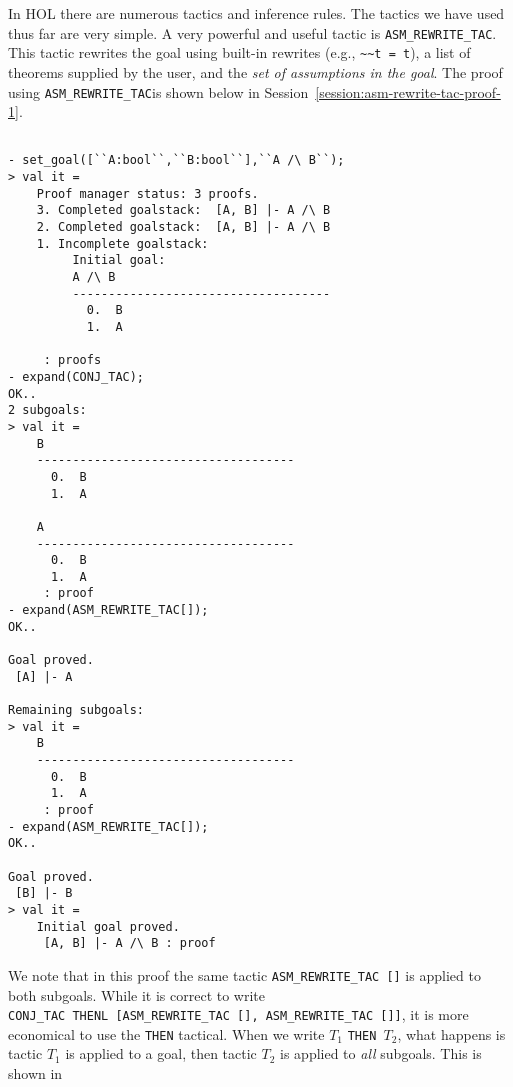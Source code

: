 In HOL there are numerous tactics and inference rules. The tactics we
have used thus far are very simple.  A very powerful and useful tactic
is \verb|ASM_REWRITE_TAC|.  This tactic rewrites the goal using
built-in rewrites (e.g., \verb|~~t = t|), a list of theorems supplied
by the user, and the \emph{set of assumptions in the goal}. The proof
using \verb|ASM_REWRITE_TAC|is shown below in
Session~\ref{session:asm-rewrite-tac-proof-1}.
\begin{session}
  \label{session:asm-rewrite-tac-proof-1}
  \begin{scriptsize}
\begin{verbatim}

- set_goal([``A:bool``,``B:bool``],``A /\ B``);
> val it =
    Proof manager status: 3 proofs.
    3. Completed goalstack:  [A, B] |- A /\ B
    2. Completed goalstack:  [A, B] |- A /\ B
    1. Incomplete goalstack:
         Initial goal:
         A /\ B
         ------------------------------------
           0.  B
           1.  A
         
     : proofs
- expand(CONJ_TAC);
OK..
2 subgoals:
> val it =
    B
    ------------------------------------
      0.  B
      1.  A
    
    A
    ------------------------------------
      0.  B
      1.  A
     : proof
- expand(ASM_REWRITE_TAC[]);
OK..

Goal proved.
 [A] |- A

Remaining subgoals:
> val it =
    B
    ------------------------------------
      0.  B
      1.  A
     : proof
- expand(ASM_REWRITE_TAC[]);
OK..

Goal proved.
 [B] |- B
> val it =
    Initial goal proved.
     [A, B] |- A /\ B : proof
\end{verbatim}
  \end{scriptsize} \end{session} We note that in this proof the same
tactic \verb|ASM_REWRITE_TAC []| is applied to both subgoals. While it
is correct to write\\
\verb|CONJ_TAC THENL [ASM_REWRITE_TAC [], ASM_REWRITE_TAC []]|, it is
more economical to use the \texttt{THEN} tactical. When we write $T_1$
\verb|THEN |$T_2$, what happens is tactic $T_1$ is applied to a goal,
then tactic $T_2$ is applied to \emph{all} subgoals. This is shown in
